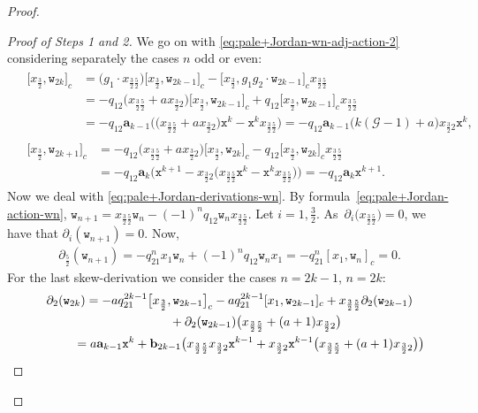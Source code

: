 \documentclass[pdftex]{sigma}
\numberwithin{equation}{section}
\newcommand{\ghost}{\mathscr{G}}
\newcommand{\ab}{\mathbf a}
\newcommand{\bb}{\mathbf b}
\newcommand{\wt}{\mathtt{w}}
\newcommand{\xt}{\mathtt{x}}
\newcommand{\tresdos}{\frac{3}{2}}
\newcommand{\cincodos}{\frac{5}{2}}
\begin{document}
\begin{proof}
\begin{proof}[Proof of Steps 1 and 2]
We go on with \eqref{eq:pale+Jordan-wn-adj-action-2} considering separately the cases $n$ odd or even:
\begin{align*}
&\begin{aligned}
\big[x_{\tresdos}, \wt_{2k}\big]_c &=
\big(g_1 \cdot x_{\tresdos\cincodos}\big)\big[x_{\tresdos},\wt_{2k-1}\big]_c -\big[x_{\tresdos},g_1g_2\cdot \wt_{2k-1}\big]_c x_{\tresdos\cincodos}
\\
&= -q_{12}\big(x_{\tresdos\cincodos}+ax_{\tresdos2}\big) \big[x_{\tresdos},\wt_{2k-1}\big]_c+q_{12} \big[x_{\tresdos},\wt_{2k-1}\big]_c x_{\tresdos\cincodos}
\\
&= -q_{12}\ab_{k-1} \big(\big(x_{\tresdos\cincodos}+ax_{\tresdos2}\big) \xt^{k} - \xt^{k}x_{\tresdos\cincodos}\big)
= -q_{12}\ab_{k-1} \big(k(\ghost-1)+a\big) x_{\tresdos2}\xt^{k},
\end{aligned}
\\
&\begin{aligned}
\big[x_{\tresdos}, \wt_{2k+1}\big]_c &= -q_{12}\big(x_{\tresdos\cincodos}+ax_{\tresdos2}\big) \big[x_{\tresdos},\wt_{2k}\big]_c -
q_{12} \big[x_{\tresdos},\wt_{2k}\big]_c x_{\tresdos\cincodos}
\\
&=-q_{12} \ab_k \big(\xt^{k+1} - x_{\tresdos2}\big(x_{\tresdos\cincodos}\xt^{k}
- \xt^{k} x_{\tresdos\cincodos}\big)\big) = -q_{12} \ab_k \xt^{k+1}.
\end{aligned}
\end{align*}
Now we deal with \eqref{eq:pale+Jordan-derivations-wn}. By formula~\eqref{eq:pale+Jordan-action-wn}, $\wt_{n+1}=x_{\tresdos\cincodos}\wt_n-(-1)^nq_{12} \wt_n x_{\tresdos\cincodos}$. Let $i=1,\tresdos$. As~${\partial_i\big(x_{\tresdos\cincodos}\big)=0}$, we have that $\partial_i(\wt_{n+1})=0$. Now,
\begin{align*}
\partial_{\cincodos} (\wt_{n+1}) = -q_{21}^n x_1 \wt_n+(-1)^nq_{12} \wt_n x_1
= -q_{21}^n [x_1, \wt_n]_c=0.
\end{align*}
For the last skew-derivation we consider the cases $n=2k-1$, $n=2k$:
\begin{gather*}
\partial_{2} (\wt_{2k})
= -aq_{21}^{2k-1}\big[x_{\tresdos},\wt_{2k-1}\big]_c -aq_{21}^{2k-1}[x_{1},\wt_{2k-1}]_c
+x_{\tresdos\cincodos}\partial_2(\wt_{2k-1})
\\ \hphantom{\partial_{2} (\wt_{2k})= }
{}+ \partial_2(\wt_{2k-1}) \big(x_{\tresdos\cincodos}+(a+1)x_{\tresdos2}\big)
\\ \hphantom{\partial_{2} (\wt_{2k})}
{}= a\ab_{k-1} \xt^{k} +\bb_{2k-1} \big(x_{\tresdos\cincodos}x_{\tresdos2}\xt^{k-1}+x_{\tresdos2}\xt^{k-1} \big(x_{\tresdos\cincodos}+(a+1)x_{\tresdos2}\big)\big)

\end{gather*}
\end{proof}
\end{proof}
\end{document}
